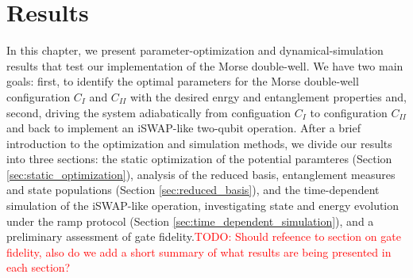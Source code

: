 \documentclass{subfiles}
\begin{document}
\chapter{Results}
In this chapter, we present parameter-optimization and dynamical-simulation results that test our implementation of the Morse double-well. We have two main goals: first, to identify the optimal parameters for the Morse double-well configuration $C_I$ and $C_{II}$ with the desired enrgy and entanglement properties and, second, driving the system adiabatically from configuation $C_I$ to configuration $C_{II}$ and back to implement an iSWAP-like two-qubit operation. After a brief introduction to the optimization and simulation methods, we divide our results into three sections: the static optimization of the potential paramteres (Section \ref{sec:static_optimization}), analysis of the reduced basis, entanglement measures and state populations (Section \ref{sec:reduced_basis}), and the time-dependent simulation of the iSWAP-like operation, investigating state and energy evolution under the ramp protocol (Section \ref{sec:time_dependent_simulation}), and a preliminary assessment of gate fidelity.\textcolor{red}{TODO: Should refeence to section on gate fidelity, also do we add a short summary of what results are being presented in each section?}
\newpage




\end{document}
